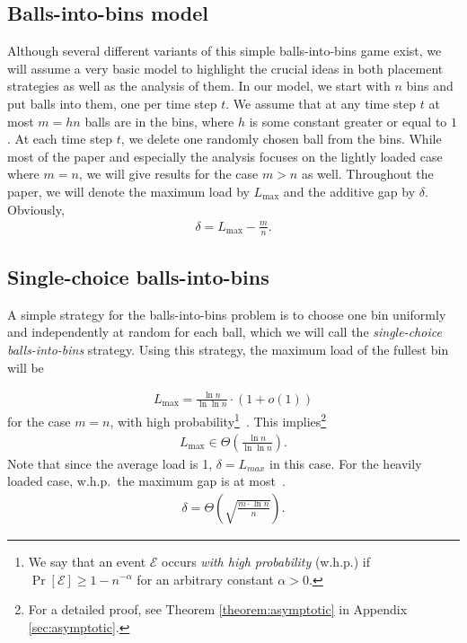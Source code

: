 \documentclass[a4paper,12pt]{article}
\newcommand\load{L_{\mathrm{max}}}
\begin{document}
\subsection{Balls-into-bins model}
\label{sec:model}
Although several different variants of this simple balls-into-bins game exist, we will assume a very basic model to highlight the crucial ideas in both placement strategies as well as the analysis of them. In our model, we start with $n$ bins and put balls into them, one per time step $t$. We assume that at any time step $t$ at most $m = h n$ balls are in the bins, where $h$ is some constant greater or equal to $1$. At each time step $t$, we delete one randomly chosen ball from the bins. While most of the paper and especially the analysis focuses on the lightly loaded case where $m=n$, we will give results for the case $m > n$ as well. Throughout the paper, we will denote the maximum load by $\load$ and the additive gap by $\delta$. Obviously, 
\begin{align*}
\delta = \load - \frac{m}{n}.
\end{align*}

\subsection{Single-choice balls-into-bins}
\label{sec:single-choice}
A simple strategy for the balls-into-bins problem is to choose one bin uniformly and independently at random for each ball, which we will call the \emph{single-choice balls-into-bins} strategy. Using this strategy, the maximum load of the fullest bin will be
\begin{comment}
\footnote{A more accurate result exists: The maximum load is $\load = \Gamma^{-1}\left(n\right)\left(1+O\left(\frac{1}{\log \Gamma^{-1}\left(n\right)}\right)\right)$ \cite{G91}.}
\end{comment}
\begin{align*}
\load = \frac{\ln n}{\ln \ln n} \cdot \left(1 + o\left(1\right)\right)
\end{align*}
for the case $m=n$, with high probability\footnote{We say that an event $\mathcal E$ occurs \emph{with high probability} (w.h.p.) if $\Pr\left[\mathcal E \right] \geq 1 - n^{-\alpha}$ for an arbitrary constant $\alpha > 0$.}~\cite{RS98}. This implies\footnote{For a detailed proof, see Theorem \ref{theorem:asymptotic} in Appendix \ref{sec:asymptotic}.}
\begin{align*}
\load\in \Theta\left(\frac{\ln n}{\ln \ln n}\right).
\end{align*}
Note that since the average load is 1, $\delta = L_{max}$ in this case. For the heavily loaded case, w.h.p.~the maximum gap is at most~\cite{RS98}.
\begin{align*}
\delta = \Theta\left(\sqrt{\frac{m \cdot \ln n}{n}}\right).
\end{align*}
\end{document}
